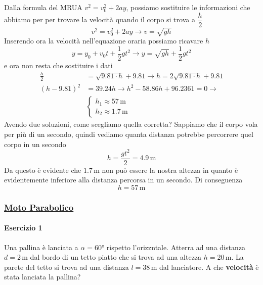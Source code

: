 Dalla formula del MRUA $v^2 = v_0^2 + 2ay$, possiamo sostituire le informazioni che abbiamo per per
trovare la velocità quando il corpo si trova a $\dfrac{h}{2}$
\begin{equation*}
v^2 = v_0^2 + 2ay \rightarrow v = \sqrt{gh}
\end{equation*}
Inserendo ora la velocità nell'equazione oraria possiamo ricavare $h$
\begin{equation*}
y = y_0 + v_0t + \frac{1}{2}gt^2 \rightarrow y = \sqrt{gh} + \frac{1}{2}gt^2
\end{equation*}
e ora non resta che sostituire i dati
\begin{align*}
\frac{h}{2} &= \sqrt{9.81\cdot h} + 9.81 \rightarrow h = 2\sqrt{9.81\cdot h} + 9.81\\
(h-9.81)^2 &= 39.24h \rightarrow h^2 -58.86h + 96.2361 = 0 \rightarrow\\
&\begin{cases}
h_1 \approx 57\,\text{m}\\
h_2 \approx 1.7\,\text{m}
\end{cases}
\end{align*}
Avendo due soluzioni, come scegliamo quella corretta? Sappiamo che il corpo vola per più di un 
secondo, quindi vediamo quanta distanza potrebbe percorrere quel corpo in un secondo
\begin{equation*}
h = \frac{gt^2}{2} = 4.9\,\text{m}
\end{equation*}
Da questo è evidente che $1.7\,\text{m}$ non può essere la nostra altezza in quanto è evidentemente 
inferiore alla distanza percorsa in un secondo. Di conseguenza
\begin{equation*}
\boxed{h = 57\,\text{m}}
\end{equation*}

\subsubsection*{\hyperref[subsec:cinematica:mp]{Moto Parabolico}}\label{ex:mp}
\paragraph{Esercizio 1}
Una pallina è lanciata a $\alpha = \ang{60}$ rispetto l'orizzntale. Atterra ad una distanza 
$d=2\,\text{m}$ dal bordo di un tetto piatto che si trova ad una altezza $h = 20\,\text{m}$. La parete
del tetto si trova ad una distanza $l=38\,\text{m}$ dal lanciatore. A che \textbf{velocità} è stata
lanciata la pallina?

